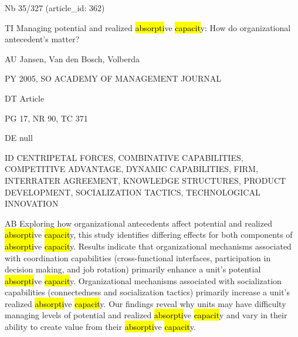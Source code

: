 \documentclass[a4paper]{article}
\begin{document}
\vspace*{-2cm}
Nb \tabto{0cm}35/327 (article\_id: 362)\par
TI \tabto{0cm}Managing potential and realized \hl{absorpti}ve \hl{capacit}y: How do organizational antecedent's matter?\par
AU \tabto{0cm}Jansen, Van den Bosch, Volberda\par
PY \tabto{0cm}2005, SO ACADEMY OF MANAGEMENT JOURNAL\par
DT \tabto{0cm}Article\par
PG \tabto{0cm}17, NR 90, TC 371\par
DE \tabto{0cm}null\par
ID \tabto{0cm}CENTRIPETAL FORCES, COMBINATIVE CAPABILITIES, COMPETITIVE ADVANTAGE, DYNAMIC CAPABILITIES, FIRM, INTERRATER AGREEMENT, KNOWLEDGE STRUCTURES, PRODUCT DEVELOPMENT, SOCIALIZATION TACTICS, TECHNOLOGICAL INNOVATION\par
AB \tabto{0cm}Exploring how organizational antecedents affect potential and realized \hl{absorpti}ve \hl{capacit}y, this study identifies differing effects for both components of \hl{absorpti}ve \hl{capacit}y. Results indicate that organizational mechanisms associated with coordination capabilities (cross-functional interfaces, participation in decision making, and job rotation) primarily enhance a unit's potential \hl{absorpti}ve \hl{capacit}y. Organizational mechanisms associated with socialization capabilities (connectedness and socialization tactics) primarily increase a unit's realized \hl{absorpti}ve \hl{capacit}y. Our findings reveal why units may have difficulty managing levels of potential and realized \hl{absorpti}ve \hl{capacit}y and vary in their ability to create value from their \hl{absorpti}ve \hl{capacit}y.\par
\clearpage
\end{document}
